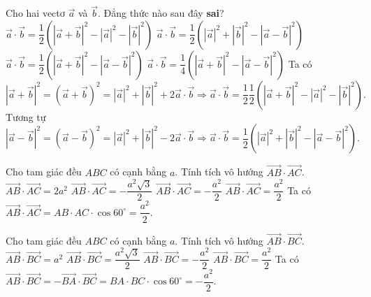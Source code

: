\begin{ex}%
	Cho hai vectơ $\vec{a}$ và $\vec{b}$. Đẳng thức nào sau đây {\bf sai}?
	\choice
	{$\vec{a}\cdot \vec{b}=\dfrac{1}
	{2}\left(\left|\vec{a}+\vec{b}\right|^2-\left|\vec{a}\right|^2-\left|\vec{b}\right|^2\right)$}
	{$\vec{a}\cdot \vec{b}=\dfrac{1}
	{2}\left(\left|\vec{a}\right|^2+\left|\vec{b}\right|^2-\left|\vec{a}-\vec{b}\right|^2\right)$}
	{\True $\vec{a}\cdot \vec{b}=\dfrac{1}{2}\left(\left|\vec{a}+\vec{b}\right|^2-\left|\vec{a}-\vec{b}\right|^2\right)$}
	{$\vec{a}\cdot \vec{b}=\dfrac{1}{4}\left(\left|\vec{a}+\vec{b}\right|^2-\left|\vec{a}-\vec{b}\right|^2\right)$}
	\loigiai
	{
	Ta có $\left|\vec{a}+\vec{b}\right|^2=\left(\vec{a}+\vec{b}\right)^2=\left|\vec{a}\right|^2+\left|\vec{b}\right|^2+2\vec{a}\cdot \vec{b}\Rightarrow \vec{a}\cdot \vec{b}=\dfrac{1}{2}\dfrac{1}{2}\left(\left|\vec{a}+\vec{b}\right|^2-\left|\vec{a}\right|^2-\left|\vec{b}\right|^2\right).$	\\
	Tương tự
	$\left|\vec{a}-\vec{b}\right|^2=\left(\vec{a}-\vec{b}\right)^2=\left|\vec{a}\right|^2+\left|\vec{b}\right|^2-2\vec{a}\cdot \vec{b}\Rightarrow \vec{a}\cdot \vec{b}=\dfrac{1}{2}\left(\left|\vec{a}\right|^2+\left|\vec{b}\right|^2-\left|\vec{a}-\vec{b}\right|^2\right).$
	}
\end{ex}
\begin{ex}%
	Cho tam giác đều $ABC$ có cạnh bằng $a$. Tính tích vô hướng $\vec{AB}\cdot \vec{AC}$.
	\choice
	{$\vec{AB}\cdot \vec{AC}=2a^2$}
	{$\vec{AB}\cdot \vec{AC}=-\dfrac{a^2\sqrt{3}}
	{2}$}
	{$\vec{AB}\cdot \vec{AC}=-\dfrac{a^2}{2}$}
	{\True $\vec{AB}\cdot \vec{AC}=\dfrac{a^2}{2}$}
	\loigiai
	{
	Ta có $\vec{AB}\cdot \vec{AC}=AB\cdot AC\cdot \cos 60^\circ=\dfrac{a^2}{2}$.
	}
\end{ex}
\begin{ex}%
	Cho tam giác đều $ABC$ có cạnh bằng $a$. Tính tích vô hướng $\vec{AB}\cdot \vec{BC}$.
	\choice
	{$\vec{AB}\cdot \vec{BC}=a^2$}
	{$\vec{AB}\cdot \vec{BC}=\dfrac{a^2\sqrt{3}}
	{2}$}
	{\True $\vec{AB}\cdot \vec{BC}=-\dfrac{a^2}{2}$}
	{$\vec{AB}\cdot \vec{BC}=\dfrac{a^2}{2}$}
	\loigiai
	{
	Ta có $\vec{AB}\cdot \vec{BC}=-\vec{BA}\cdot \vec{BC}=BA\cdot BC\cdot \cos 60^\circ=-\dfrac{a^2}{2}$.
	}
\end{ex}
